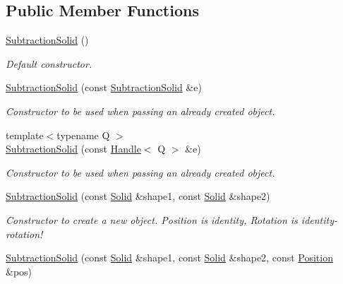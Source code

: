 \subsection*{Public Member Functions}
\begin{DoxyCompactItemize}
\item 
\hyperlink{class_d_d4hep_1_1_geometry_1_1_subtraction_solid_aa659d040bc5720bcc3a967508ce2c203}{SubtractionSolid} ()
\begin{DoxyCompactList}\small\item\em Default constructor. \item\end{DoxyCompactList}\item 
\hyperlink{class_d_d4hep_1_1_geometry_1_1_subtraction_solid_af79b5d4942ce415ed319dfb29bd58c47}{SubtractionSolid} (const \hyperlink{class_d_d4hep_1_1_geometry_1_1_subtraction_solid}{SubtractionSolid} \&e)
\begin{DoxyCompactList}\small\item\em Constructor to be used when passing an already created object. \item\end{DoxyCompactList}\item 
{\footnotesize template$<$typename Q $>$ }\\\hyperlink{class_d_d4hep_1_1_geometry_1_1_subtraction_solid_a72e018b273167f9ecd373c369ce1067e}{SubtractionSolid} (const \hyperlink{class_d_d4hep_1_1_handle}{Handle}$<$ Q $>$ \&e)
\begin{DoxyCompactList}\small\item\em Constructor to be used when passing an already created object. \item\end{DoxyCompactList}\item 
\hyperlink{class_d_d4hep_1_1_geometry_1_1_subtraction_solid_a41ea60f70c3ad3d119510470610936ec}{SubtractionSolid} (const \hyperlink{class_d_d4hep_1_1_geometry_1_1_solid__type}{Solid} \&shape1, const \hyperlink{class_d_d4hep_1_1_geometry_1_1_solid__type}{Solid} \&shape2)
\begin{DoxyCompactList}\small\item\em Constructor to create a new object. Position is identity, Rotation is identity-\/rotation! \item\end{DoxyCompactList}\item 
\hyperlink{class_d_d4hep_1_1_geometry_1_1_subtraction_solid_a7db81162af38bc569247d94d06d7b3fd}{SubtractionSolid} (const \hyperlink{class_d_d4hep_1_1_geometry_1_1_solid__type}{Solid} \&shape1, const \hyperlink{class_d_d4hep_1_1_geometry_1_1_solid__type}{Solid} \&shape2, const \hyperlink{namespace_d_d4hep_1_1_geometry_a55083902099d03506c6db01b80404900}{Position} \&pos)

\end{DoxyCompactItemize}
